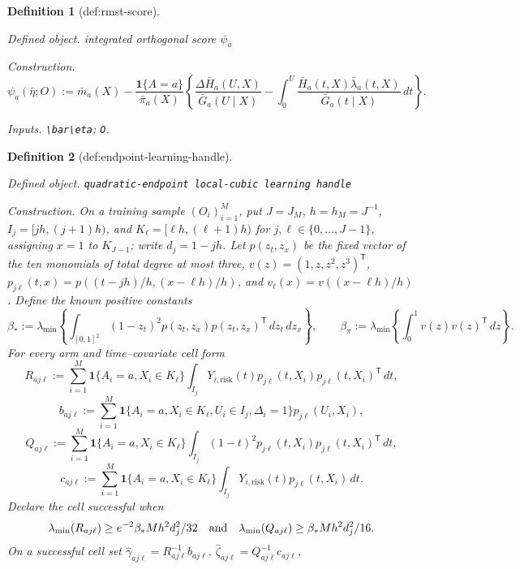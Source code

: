 \documentclass{article}
\newtheorem{definition}{Definition}
\begin{document}
\begin{definition}[def:rmst-score]\label{def:rmst-score}
\par\smallskip\noindent\emph{Defined object.} integrated orthogonal score \(\psi_a\)
\par\smallskip\noindent\emph{Construction.} \[\psi_a(\bar\eta;O):=\bar m_a(X)-\frac{\mathbf 1\{A=a\}}{\bar\pi_a(X)}\left\{\frac{\Delta\bar H_a(U,X)}{\bar G_a(U\mid X)}-\int_0^U\frac{\bar H_a(t,X)\bar\lambda_a(t,X)}{\bar G_a(t\mid X)}\,dt\right\}.\]
\par\smallskip\noindent\emph{Inputs.} \texttt{\textbackslash{}\allowbreak{}bar\textbackslash{}\allowbreak{}eta}; \texttt{O}.
\end{definition}

\begin{definition}[def:endpoint-learning-handle]\label{def:endpoint-learning-handle}
\par\smallskip\noindent\emph{Defined object.} \texttt{quadratic-\allowbreak{}endpoint local-\allowbreak{}cubic learning handle}
\par\smallskip\noindent\emph{Construction.} On a training sample \((O_i)_{i=1}^M\), put \(J=J_M\), \(h=h_M=J^{-1}\), \(I_j=[jh,(j+1)h)\), and \(K_\ell=[\ell h,(\ell+1)h)\) for \(j,\ell\in\{0,\ldots,J-1\}\), assigning \(x=1\) to \(K_{J-1}\); write \(d_j=1-jh\).  Let \(p(z_t,z_x)\) be the fixed vector of the ten monomials of total degree at most three, \(v(z)=(1,z,z^2,z^3)^{\mathsf T}\), \(p_{j\ell}(t,x)=p((t-jh)/h,(x-\ell h)/h)\), and \(v_\ell(x)=v((x-\ell h)/h)\).  Define the known positive constants
\[
 \beta_*:=\lambda_{\min}\!\left\{\int_{[0,1]^2}(1-z_t)^2p(z_t,z_x)p(z_t,z_x)^{\mathsf T}\,dz_t\,dz_x\right\},
 \qquad
 \beta_\pi:=\lambda_{\min}\!\left\{\int_0^1v(z)v(z)^{\mathsf T}\,dz\right\}.
\]
For every arm and time--covariate cell form
\[
 R_{aj\ell}:=\sum_{i=1}^M\mathbf 1\{A_i=a,X_i\in K_\ell\}
 \int_{I_j}Y_{i,\mathrm{risk}}(t)p_{j\ell}(t,X_i)p_{j\ell}(t,X_i)^{\mathsf T}\,dt,
\]
\[
 b_{aj\ell}:=\sum_{i=1}^M\mathbf 1\{A_i=a,X_i\in K_\ell,U_i\in I_j,\Delta_i=1\}p_{j\ell}(U_i,X_i),
\]
\[
 Q_{aj\ell}:=\sum_{i=1}^M\mathbf 1\{A_i=a,X_i\in K_\ell\}
 \int_{I_j}(1-t)^2p_{j\ell}(t,X_i)p_{j\ell}(t,X_i)^{\mathsf T}\,dt,
\]
\[
 c_{aj\ell}:=\sum_{i=1}^M\mathbf 1\{A_i=a,X_i\in K_\ell\}
 \int_{I_j}Y_{i,\mathrm{risk}}(t)p_{j\ell}(t,X_i)\,dt.
\]
Declare the cell successful when
\[
 \lambda_{\min}(R_{aj\ell})\ge e^{-2}\beta_*Mh^2d_j^2/32
 \quad\hbox{and}\quad
 \lambda_{\min}(Q_{aj\ell})\ge\beta_*Mh^2d_j^2/16.
\]
On a successful cell set \(\widehat\gamma_{aj\ell}=R_{aj\ell}^{-1}b_{aj\ell}\), \(\widehat\zeta_{aj\ell}=Q_{aj\ell}^{-1}c_{aj\ell}\),

\end{definition}
\end{document}

